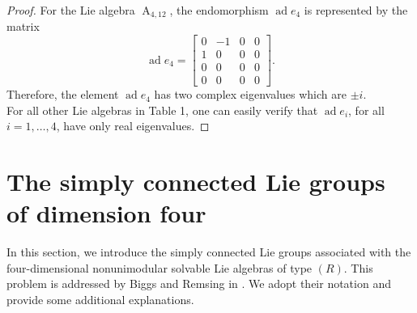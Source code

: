 \documentclass[12pt,a4paper,twoside]{article}
\theoremstyle{definition}
\begin{document}
\begin{proof}
For the Lie algebra $\operatorname{A}_{4, 12}$, the endomorphism $\operatorname{ad} e_4$ is represented by the matrix
$$\operatorname{ad} e_4 = \begin{bmatrix}
0 & -1 & 0 & 0\\
1 & 0 & 0 & 0\\
0 & 0 & 0 & 0\\
0 & 0 & 0 & 0
\end{bmatrix}.$$
Therefore, the element $\operatorname{ad} e_4$ has two complex eigenvalues which are $\pm i$.\\
For all other Lie algebras in Table 1, one can easily verify that $\operatorname{ad} e_i$, for all $i = 1, \dots, 4$, have only real eigenvalues.
\end{proof}
\section{The simply connected Lie groups of dimension four}
In this section, we introduce the simply connected Lie groups associated with the four-dimensional nonunimodular solvable Lie algebras of type $(R)$. This problem is addressed by Biggs and Remsing in \cite{biggs2016classification}. We adopt their notation and provide some additional explanations.
\end{document}

